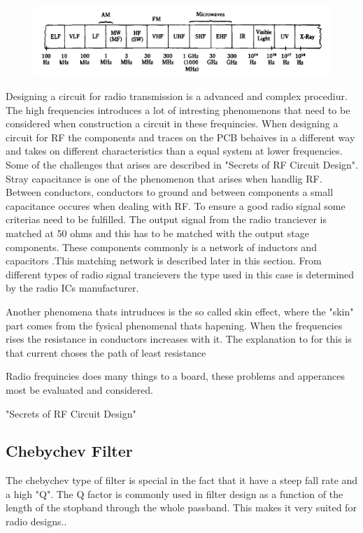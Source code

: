 \begin{figure}[H] 
	\centering 
	\includegraphics[width=.8\linewidth]{Figures/Full_frequency_band} 
	\label{fig:full_freq_band} 
\end{figure} 

Designing a circuit for radio transmission is a advanced and complex procediur. The high frequencies introduces a lot of intresting phenomenons that need to be considered when construction a circuit in these frequincies. When designing a circuit for RF the components and traces on the PCB behaives in a different way and takes on different characteristics than a equal system at lower frequencies. Some of the challenges that arises are described in "Secrets of RF Circuit Design". Stray capacitance is one of the phenomenon that arises when handlig RF. Between conductors, conductors to ground and between components a small capacitance occures when dealing with RF. To ensure a good radio signal  some criterias need to be fulfilled. 
The output signal from the radio tranciever is matched at 50 ohms and this has to be matched with the output stage components. These components commonly is a network of inductors and capacitors .This matching network is described later in this section. 
From different types of radio signal trancievers the type used in this case is determined by the radio ICs manufacturer. %


Another phenomena thats intruduces is the so called skin effect, where the "skin" part comes from the fysical phenomenal thats hapening. When the frequencies rises the resistance in conductors increases with it. The explanation to for this is that current choses the path of least resistance


Radio frequincies does many things to a board, these problems and apperances most be evaluated and considered.  



"Secrets of RF Circuit Design"
 
\subsection{Chebychev Filter}
The chebychev type of filter is special in the fact that it have a steep fall rate and a high "Q". The Q factor is commonly used in filter design as a function of the length of the stopband through the whole passband.
This makes it very suited for radio designs.. 


